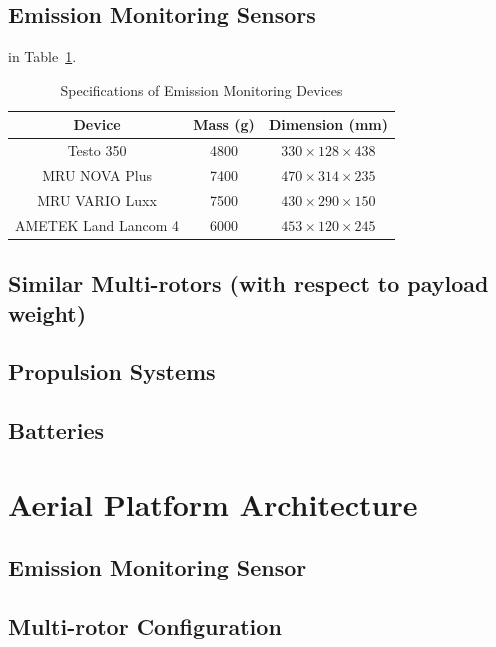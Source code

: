\documentclass[lettersize,journal]{IEEEtran}
\begin{document}
\subsection{Emission Monitoring Sensors}
in Table~\ref{tab1}.
\begin{table}
\begin{center}
\caption{Specifications of Emission Monitoring Devices}
\label{tab1}
\begin{tabular}{| c | c | c |}
\hline
Device & Mass (g) & Dimension (mm)\\
\hline
Testo 350\cite{testo350specs} & 4800 & $330 \times 128 \times 438$ \\
\hline
MRU NOVA Plus\cite{MRUNovaPluseSpecs} & 7400 & $470 \times 314 \times 235$ \\
\hline
MRU VARIO Luxx\cite{MRUVARIOLuxx} & 7500 & $430 \times 290 \times 150$ \\
\hline
AMETEK Land Lancom 4\cite{AMETEKLandLancom4} & 6000 & $453 \times 120 \times 245$ \\
\hline
\end{tabular}
\end{center}
\end{table}

\subsection{Similar Multi-rotors (with respect to payload weight)}
\subsection{Propulsion Systems}
\subsection{Batteries}

\section{Aerial Platform Architecture}
\subsection{Emission Monitoring Sensor}
\subsection{Multi-rotor Configuration}
\end{document}
